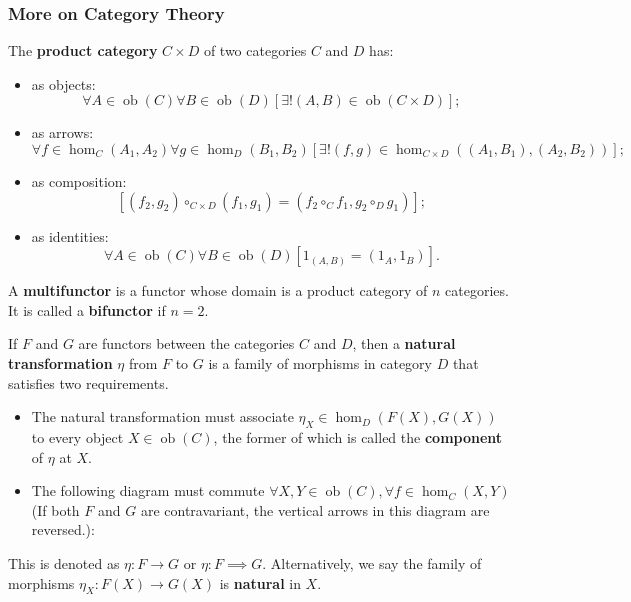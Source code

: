 \documentclass[12pt, letterpaper]{article}
\newcommand{\ob}{\operatorname{ob}}
\theoremstyle{definition}
\theoremstyle{remark}
\theoremstyle{definition}
\theoremstyle{plain}
\numberwithin{equation}{section}
\begin{document}
	\subsubsection{More on Category Theory}
	\label{sec:more_cat_theory}
	\begin{def*}
		The \textbf{product category} $C \times D$ of two categories $C$ and $D$ has:
		
		\begin{itemize}
			\item as objects:
			\[\forall A \in \ob(C) \forall B \in \ob(D) [\exists!(A, B)\in \ob(C\times D)];\]
			\item as arrows:
			\[\forall f \in \hom_C(A_1,A_2) \forall g \in \hom_D(B_1,B_2)
			[\exists! (f,g)\in \hom_{C\times D}((A_1, B_1), (A_2, B_2))];\]
			\item as composition:
			\[
			[(f_2, g_2) \circ_{C\times D} (f_1, g_1) = (f_2 \circ_{C} f_1, g_2 \circ_{D} g_1)];\]
			\item as identities:
			\[ \forall A \in \ob(C) \forall B \in \ob(D)
			[1_{(A, B)} = (1_A, 1_B)]. \]
			
		\end{itemize}
	\end{def*}
	\begin{def*}[multifunctor]
		A \textbf{multifunctor} is a functor whose domain is a product category of $n$ categories.
		It is called a \textbf{bifunctor} if $n=2$.
	\end{def*}
	\begin{def*}
		If $F$ and $G$ are functors between the categories $C$ and $D$,
		then a \textbf{natural transformation} $\eta$ from $F$ to $G$ is a family of morphisms
		in category $D$ that satisfies two requirements.
		\begin{itemize}
			\item The natural transformation must associate $\eta_X\in\hom_D(F(X), G(X))$ to every object $X \in \ob(C)$,
			the former of which is called the \textbf{component} of $\eta$ at $X$.
			\item The following diagram must commute $\forall X,Y \in \ob(C), \forall f \in \hom_C(X,Y)$
			(If both $F$ and $G$ are contravariant, the vertical arrows in this diagram are reversed.):
			\begin{center}
			\end{center}
		\end{itemize}
		This is denoted as $\eta\colon F\to G$ or $\eta\colon F\implies G$.
		Alternatively, we say the family of morphisms $\eta_{X}\colon F(X)\to G(X)$ is \textbf{natural} in $X$.
	\end{def*}
\end{document}
